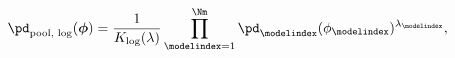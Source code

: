 \begin{equation}
\begin{gathered}
  \pd_{\text{pool, log}}(\boldsymbol{\phi}) =
  \frac{1}{K_{\text{log}}(\lambda)}
  \prod_{\modelindex = 1}^{\Nm}
    \pd_{\modelindex}(\phi_{\modelindex})^{\lambda_{\modelindex}}, %
  \label{eqn:pooled-prior-overall}
\end{gathered}
\end{equation}